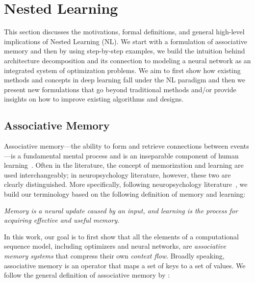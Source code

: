\section{Nested Learning}\label{sec:nested-learning}
This section discusses the motivations, formal definitions, and general high-level implications of Nested Learning (NL). We start with a formulation of associative memory and then by using step-by-step examples, we build the intuition behind architecture decomposition and its connection to modeling a neural network as an integrated system of optimization problems. We aim to first show how existing methods and concepts in deep learning fall under the NL paradigm and then we present new formulations that go beyond traditional methods and/or provide insights on how to improve existing algorithms and designs. 




\subsection{Associative Memory}\label{sec:associaitve-memory}
Associative memory—the ability to form and retrieve connections between events—is a fundamental mental process and is an inseparable component of human learning~\citep{terry2017learning}. Often in the literature, the concept of memorization and learning are used interchangeably; in neuropsychology literature, however, these two are clearly distinguished. More specifically, following neuropsychology literature~\citep{okano2000learning}, we build our terminology based on the following definition of memory and learning: 


\vspace{8pt}
\begin{myboxi}
\textit{Memory is a neural update caused by an input, and {learning} is the process for acquiring effective and useful memory.}
\end{myboxi}
\vspace{8pt}

In this work, our goal is to first show that all the elements of a computational sequence model, including optimizers and neural networks, are \emph{associative memory systems} that compress their own \emph{context flow}. Broadly speaking, associative memory is an operator that maps a set of keys to a set of values. We follow the general definition of associative memory by \citet{behrouz2025Miras}: 

